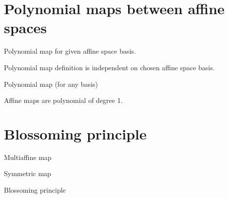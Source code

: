 %

\section{Polynomial maps between affine spaces}
\begin{definition}
    Polynomial map for given affine space basis.
\end{definition}
\begin{theorem}
    Polynomial map definition is independent on chosen affine space basis.
\end{theorem}
\begin{definition}
    Polynomial map (for any basis)
\end{definition}

\begin{theorem}
    Affine maps are polynomial of degree 1.
\end{theorem}

\section{Blossoming principle}
\begin{definition}
    Multiaffine map
\end{definition}
\begin{definition}
    Symmetric map
\end{definition}
\begin{theorem}
    Blossoming principle
\end{theorem}